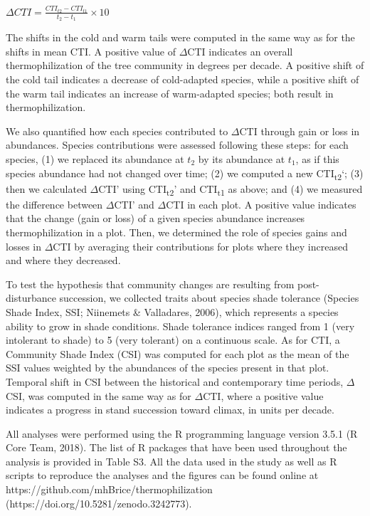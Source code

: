 \documentclass[
  a4paperpaper,
]{article}
\begin{document}
\(\Delta CTI = \frac{CTI_{t2} - CTI_{t1}}{t_2 - t_1} \times 10\)

The shifts in the cold and warm tails were computed in the same way as
for the shifts in mean CTI. A positive value of \(\Delta\)CTI indicates
an overall thermophilization of the tree community in degrees per
decade. A positive shift of the cold tail indicates a decrease of
cold-adapted species, while a positive shift of the warm tail indicates
an increase of warm-adapted species; both result in thermophilization.

We also quantified how each species contributed to \(\Delta\)CTI through
gain or loss in abundances. Species contributions were assessed
following these steps: for each species, (1) we replaced its abundance
at \(t_2\) by its abundance at \(t_1\), as if this species abundance had
not changed over time; (2) we computed a new CTI\textsubscript{t2}`; (3)
then we calculated \(\Delta\)CTI' using CTI\textsubscript{t2}' and
CTI\textsubscript{t1} as above; and (4) we measured the difference
between \(\Delta\)CTI' and \(\Delta\)CTI in each plot. A positive value
indicates that the change (gain or loss) of a given species abundance
increases thermophilization in a plot. Then, we determined the role of
species gains and losses in \(\Delta\)CTI by averaging their
contributions for plots where they increased and where they decreased.

To test the hypothesis that community changes are resulting from
post-disturbance succession, we collected traits about species shade
tolerance (Species Shade Index, SSI; Niinemets \& Valladares, 2006),
which represents a species ability to grow in shade conditions. Shade
tolerance indices ranged from 1 (very intolerant to shade) to 5 (very
tolerant) on a continuous scale. As for CTI, a Community Shade Index
(CSI) was computed for each plot as the mean of the SSI values weighted
by the abundances of the species present in that plot. Temporal shift in
CSI between the historical and contemporary time periods, \(\Delta\)CSI,
was computed in the same way as for \(\Delta\)CTI, where a positive
value indicates a progress in stand succession toward climax, in units
per decade.

All analyses were performed using the R programming language version
3.5.1 (R Core Team, 2018). The list of R packages that have been used
throughout the analysis is provided in Table S3. All the data used in
the study as well as R scripts to reproduce the analyses and the figures
can be found online at https://github.com/mhBrice/thermophilization
(https://doi.org/10.5281/zenodo.3242773).
\end{document}
